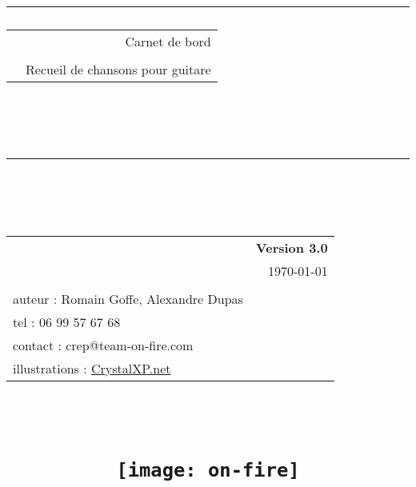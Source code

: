 \newlength{\larg}
\setlength{\larg}{14.5cm}

\title{
{\rule{\larg}{1mm}}\vspace{7mm}
\begin{tabular}{p{4cm} r}
   & {\Huge Carnet de bord} \\
   & \\
   & {\Large Recueil de chansons pour guitare}
\end{tabular}\\
\vspace{2mm}
{\rule{\larg}{1mm}}
\vspace{2mm} \\
\begin{tabular}{p{11cm} r}
   & {\large \bf Version 3.0} \\
   & {\large  \today} \\
   & \\
   \small auteur : Romain Goffe, Alexandre Dupas & \\
   \small tel : 06 99 57 67 68 & \\
   \small contact : crep@team-on-fire.com & \\
   \small illustrations : \href{http://tux.crystalxp.net/}{CrystalXP.net}
   & \\
   \hline
\end{tabular}\\
\begin{flushleft}\texttt{[image: on-fire]}\end{flushleft}
}
\author{}
\date{}
